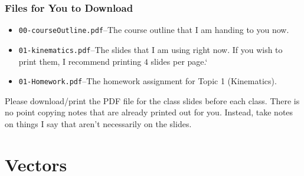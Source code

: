 \documentclass[12pt,compress,aspectratio=169]{beamer}
\begin{document}
\titlepage


\begin{frame}
  \frametitle{Files for You to Download}
  \begin{itemize}
  \item\texttt{00-courseOutline.pdf}--The course outline that I am handing to
    you now.
  \item\texttt{01-kinematics.pdf}--The slides that I am using right now. If
    you wish to print them, I recommend printing $4$ slides per page.`
  \item\texttt{01-Homework.pdf}--The homework assignment for Topic 1
    (Kinematics).
  \end{itemize}
  Please download/print the PDF file for the class slides before each class.
  There is no point copying notes that are already printed out for you.
  Instead, take notes on things I say that aren't necessarily on the slides.
\end{frame}



\section{Vectors}
\end{document}
